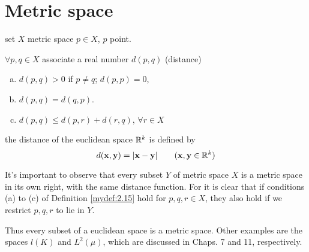 \section{Metric space}
\begin{mydef}\label{mydef:2.15}
    set $X$ metric space $p\in X$, $p$ point.

    $\forall p,q \in X$ associate a real number $d(p,q)$ (distance)
    \begin{enumerate}[a.]
        \item $d(p,q) > 0$ if $p \neq q$; $d(p,p)=0$,
        \item $d(p,q) = d(q,p)$.
        \item $d(p,q) \leq d(p,r) + d(r,q)$, $\forall r\in X$
    \end{enumerate}
\end{mydef}

\begin{newexample}
    the distance of the euclidean space ${\protect\mathbb R}^k$ is defined by
    \begin{equation}\label{eq:2.19}
        d(\mathbf{x}, \mathbf{y}) = |\mathbf{x} - \mathbf{y}|
        \qquad (\mathbf{x}, \mathbf{y}\in {\protect\mathbb R}^k)
    \end{equation}
\end{newexample}

It's important to observe that every subset $Y$ of metric space $X$ is a metric space in its own right, with the same distance function. For it is clear that if conditions (a) to (c) of Definition \ref{mydef:2.15} hold for $p, q, r \in X$, they also hold if we restrict $p, q, r$ to lie in $Y$.

Thus every subset of a euclidean space is a metric space. Other examples
are the spaces $l(K)$ and $L^2 (\mu)$, 
which are discussed in Chaps. 7 and 11, respectively.


